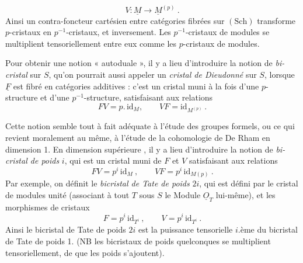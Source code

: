 \documentclass[11pt,a4paper]{article}
\begin{document}
\[
  V\colon \underline{M}\longrightarrow\underline{M}^{(p)}\ .
\]
Ainsi un contra-foncteur cartésien entre catégories fibrées sur
$(\mathrm{Sch})$ transforme $p$-cristaux en $p^{-1}$-cristaux, et inversement.
Les $p^{-1}$-cristaux de modules se multiplient tensoriellement entre eux comme
les $p$-cristaux de modules.

Pour obtenir une notion « autoduale », il y a lieu d'introduire la notion de
\emph{bi-cristal}  sur $S$, qu'on pourrait aussi appeler
un \emph{cristal de Dieudonné} sur $S$, lorsque $\underline{F}$ est fibré en
catégories additives : c'est un cristal muni à la fois d'une $p$-structure et
d'une $p^{-1}$-structure, satisfaisant aux relations
\[
  FV=p.\,\mathrm{id}_M,\qquad VF=\mathrm{id}_{M^{(p)}}\ .
\]

Cette notion semble tout à fait adéquate à l'étude des groupes formels, ou ce
qui revient moralement au même, à l'étude de la cohomologie de De Rham en
dimension 1. En dimension supérieure , il y a
lieu d'introduire la notion de \emph{bi-cristal de poids} $i$, qui est un
cristal muni de $F$ et $V$ satisfaisant aux relations
\[
  FV=p^i\,\mathrm{id}_M\ ,\qquad VF=p^i\,\mathrm{id}_{M(p)}\ .
\]
Par exemple, on définit le \emph{bicristal de Tate de poids} $2i$, qui est
défini par le cristal de modules unité (associant à tout $T$ sous $S$ le
Module $\underline{O}_T$ lui-même), et les morphismes de cristaux
\[
  F=p^i\,\mathrm{id}_{T^i}\ ,\qquad V=p^i\,\mathrm{id}_{T^i}\ .
\]
Ainsi le bicristal de Tate de poids $2i$ est la puissance tensorielle $i$.ème
du bicristal de Tate de poids 1. (NB les bicristaux
de poids quelconques se multiplient tensoriellement, de 
 que les poids s'ajoutent).
\end{document}
